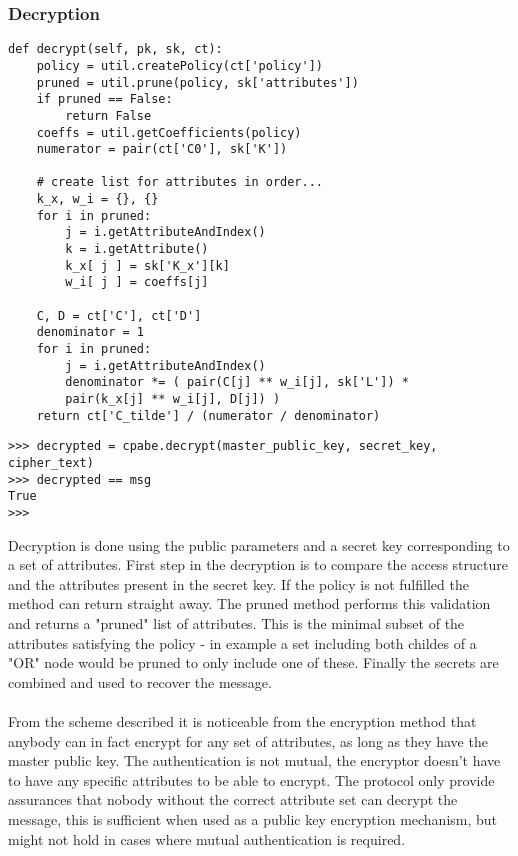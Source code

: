 \subsubsection{Decryption}
\begin{verbatim}
def decrypt(self, pk, sk, ct):
    policy = util.createPolicy(ct['policy'])
    pruned = util.prune(policy, sk['attributes'])
    if pruned == False:
        return False
    coeffs = util.getCoefficients(policy)
    numerator = pair(ct['C0'], sk['K'])
    
    # create list for attributes in order...
    k_x, w_i = {}, {}
    for i in pruned:
        j = i.getAttributeAndIndex()
        k = i.getAttribute()
        k_x[ j ] = sk['K_x'][k]
        w_i[ j ] = coeffs[j]
        
    C, D = ct['C'], ct['D']
    denominator = 1
    for i in pruned:
        j = i.getAttributeAndIndex()
        denominator *= ( pair(C[j] ** w_i[j], sk['L']) *
        pair(k_x[j] ** w_i[j], D[j]) )   
    return ct['C_tilde'] / (numerator / denominator)

\end{verbatim}

\begin{lstlisting}
>>> decrypted = cpabe.decrypt(master_public_key, secret_key, cipher_text)
>>> decrypted == msg
True
>>> 
\end{lstlisting}

Decryption is done using the public parameters and a secret key corresponding to a set of attributes. First step in the decryption is to compare the access structure and the attributes present in the secret key. If the policy is not fulfilled the method can return straight away. The pruned method performs this validation and returns a "pruned" list of attributes. This is the minimal subset of the attributes satisfying the policy - in example a set including both childes of a "OR" node would be pruned to only include one of these. Finally the secrets are combined and used to recover the message. 


\paragraph{}
From the scheme described it is noticeable from the encryption method that anybody can in fact encrypt for any set of attributes, as long as they have the master public key. The authentication is not mutual, the encryptor doesn't have to have any specific attributes to be able to encrypt. The protocol only provide assurances that nobody without the correct attribute set can decrypt the message, this is sufficient when used as a public key encryption mechanism, but might not hold in cases where mutual authentication is required.

